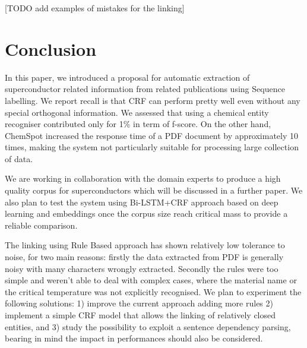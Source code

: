 \documentclass{article}
\begin{document}
[TODO add examples of mistakes for the linking]

\section{Conclusion}
In this paper, we introduced a proposal for automatic extraction of superconductor related information from related publications using Sequence labelling. We report recall is that CRF can perform pretty well even without any special orthogonal information. We assessed that using a chemical entity recogniser contributed only for 1\% in term of f-score. On the other hand, ChemSpot increased the response time of a PDF document by approximately 10 times, making the system not particularly suitable for processing large collection of data. 

We are working in collaboration with the domain experts to produce a high quality corpus for superconductors which will be discussed in a further paper. 
We also plan to test the system using Bi-LSTM+CRF approach based on deep learning and embeddings once the corpus size reach critical mass to provide a reliable comparison. 

The linking using Rule Based approach has shown relatively low tolerance to noise, for two main reasons: firstly the data extracted from PDF is generally noisy with many characters wrongly extracted. Secondly the rules were too simple and weren't able to deal with complex cases, where the material name or the critical temperature was not explicitly recognised. 
We plan to experiment the following solutions: 1) improve the current approach adding more rules 2) implement a simple CRF model that allows the linking of relatively closed entities, and 3) study the possibility to exploit a sentence dependency parsing, bearing in mind the impact in performances should also be considered.

% 
\pagebreak



\end{document}
